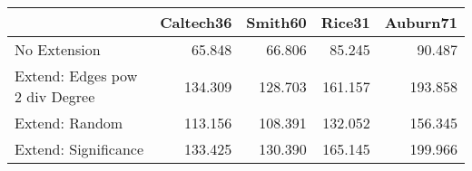 \begin{tabular}{lrrrr}
\toprule
{} & Caltech36 & Smith60 &  Rice31 & Auburn71 \\
\midrule
No Extension                   &    65.848 &  66.806 &  85.245 &   90.487 \\
Extend: Edges pow 2 div Degree &   134.309 & 128.703 & 161.157 &  193.858 \\
Extend: Random                 &   113.156 & 108.391 & 132.052 &  156.345 \\
Extend: Significance           &   133.425 & 130.390 & 165.145 &  199.966 \\
\bottomrule
\end{tabular}
